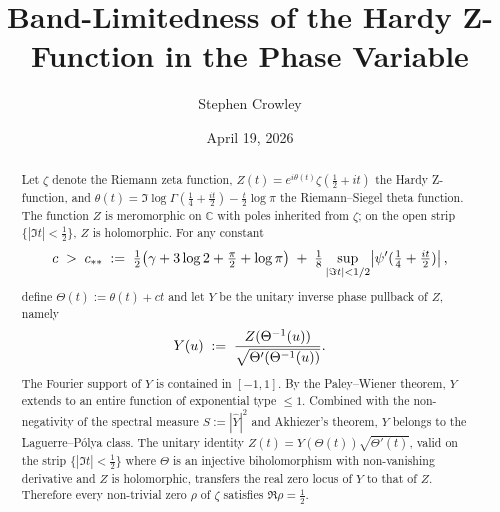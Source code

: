 \documentclass{article}
\newcommand{\assign}{:=}
\begin{document}
\title{Band-Limitedness of the Hardy Z-Function in the Phase Variable}

\author{Stephen Crowley}

\date{April 19, 2026}

\maketitle

\begin{abstract}
  Let $\zeta$ denote the Riemann zeta function, $Z (t) = e^{i \theta (t)}
  \zeta (\tfrac{1}{2} + it)$ the Hardy Z-function, and $\theta (t) = \Im \log
  \Gamma (\tfrac{1}{4} + \tfrac{it}{2}) - \tfrac{t}{2} \log \pi$ the
  Riemann--Siegel theta function. The function $Z$ is meromorphic on
  $\mathbb{C}$ with poles inherited from $\zeta$; on the open strip $\{| \Im
  t| < \tfrac{1}{2} \}$, $Z$ is holomorphic. For any constant
  \[ c \hspace{0.27em} > \hspace{0.27em} c_{\ast \ast} \hspace{0.27em} \assign
     \hspace{0.27em} \tfrac{1}{2} \hspace{-0.17em} \left( \gamma + 3 \log 2 +
     \tfrac{\pi}{2} + \log \pi \right) \hspace{0.27em} + \hspace{0.27em}
     \tfrac{1}{8} \sup_{| \Im t| < 1 / 2} \hspace{-0.17em} \left| \psi'
     (\tfrac{1}{4} + \tfrac{it}{2}) \right|, \]
  define $\Theta (t) \assign \theta (t) + ct$ and let $Y$ be the unitary
  inverse phase pullback of $Z$, namely
  \[ Y (u) \hspace{0.27em} \assign \hspace{0.27em} \frac{Z (\Theta^{- 1}
     (u))}{\sqrt{\Theta' (\Theta^{- 1} (u))}} . \]
  The Fourier support of $Y$ is contained in $[- 1, 1]$. By the Paley--Wiener
  theorem, $Y$ extends to an entire function of exponential type $\le 1$.
  Combined with the non-negativity of the spectral measure $S \assign |
  \hat{Y} |^2$ and Akhiezer's theorem, $Y$ belongs to the Laguerre--P{\'o}lya
  class. The unitary identity $Z (t) = Y (\Theta (t)) \sqrt{\Theta' (t)}$,
  valid on the strip $\{| \Im t| < \tfrac{1}{2} \}$ where $\Theta$ is an
  injective biholomorphism with non-vanishing derivative and $Z$ is
  holomorphic, transfers the real zero locus of $Y$ to that of $Z$. Therefore
  every non-trivial zero $\rho$ of $\zeta$ satisfies $\Re \rho =
  \tfrac{1}{2}$.
\end{abstract}
\end{document}
